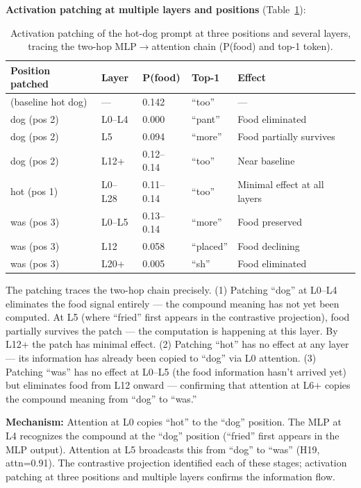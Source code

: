 \documentclass[11pt]{article}
\begin{document}
\textbf{Activation patching at multiple layers and positions} (Table~\ref{tab:hotdog-patch}):

\begin{table}[htbp]
\centering
\small
\begin{tabular}{lllll}
\toprule
Position patched & Layer & P(food) & Top-1 & Effect \\
\midrule
(baseline hot dog) & --- & 0.142 & ``too'' & --- \\
dog (pos 2) & L0--L4 & 0.000 & ``pant'' & Food eliminated \\
dog (pos 2) & L5 & 0.094 & ``more'' & Food partially survives \\
dog (pos 2) & L12+ & 0.12--0.14 & ``too'' & Near baseline \\
hot (pos 1) & L0--L28 & 0.11--0.14 & ``too'' & Minimal effect at all layers \\
was (pos 3) & L0--L5 & 0.13--0.14 & ``more'' & Food preserved \\
was (pos 3) & L12 & 0.058 & ``placed'' & Food declining \\
was (pos 3) & L20+ & 0.005 & ``sh'' & Food eliminated \\
\bottomrule
\end{tabular}
\caption{Activation patching of the hot-dog prompt at three positions and several layers, tracing the two-hop MLP$\rightarrow$attention chain (P(food) and top-1 token).}
\label{tab:hotdog-patch}
\end{table}

The patching traces the two-hop chain precisely. (1) Patching ``dog'' at L0--L4
eliminates the food signal entirely --- the compound meaning has not yet been
computed. At L5 (where ``fried'' first appears in the contrastive projection),
food partially survives the patch --- the computation is happening at this
layer. By L12+ the patch has minimal effect. (2) Patching ``hot'' has no effect
at any layer --- its information has already been copied to ``dog'' via L0
attention. (3) Patching ``was'' has no effect at L0--L5 (the food information
hasn't arrived yet) but eliminates food from L12 onward --- confirming that
attention at L6+ copies the compound meaning from ``dog'' to ``was.''

\textbf{Mechanism:} Attention at L0 copies ``hot'' to the ``dog'' position. The MLP at
L4 recognizes the compound at the ``dog'' position (``fried'' first appears in the
MLP output). Attention at L5 broadcasts this from ``dog'' to ``was'' (H19,
attn=0.91). The contrastive projection identified each of these stages; activation
patching at three positions and multiple layers confirms the information flow.
\end{document}
